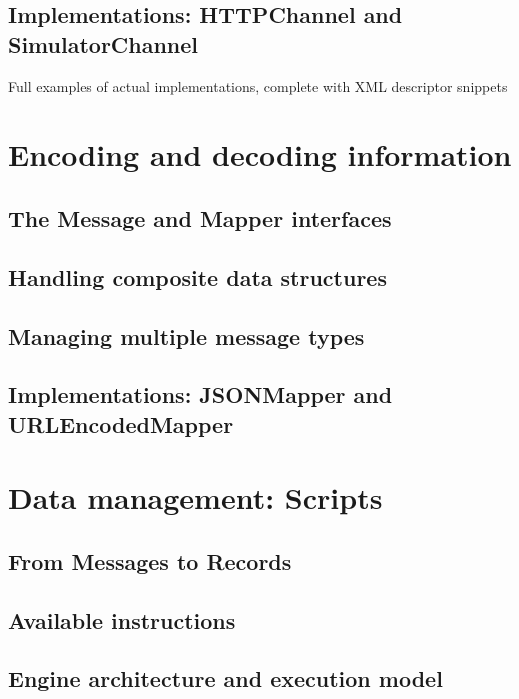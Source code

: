 \subsection{Implementations: HTTPChannel and SimulatorChannel}
\label{sec:channel.implementations}

Full examples of actual implementations, complete with XML descriptor snippets


\section{Encoding and decoding information}
\label{sec:components.mapper}

\subsection{The Message and Mapper interfaces}

\subsection{Handling composite data structures}

\subsection{Managing multiple message types}

\subsection{Implementations: JSONMapper and URLEncodedMapper}


\section{Data management: Scripts}
\label{sec:components.script}

\subsection{From Messages to Records}

\subsection{Available instructions}

\subsection{Engine architecture and execution model}

